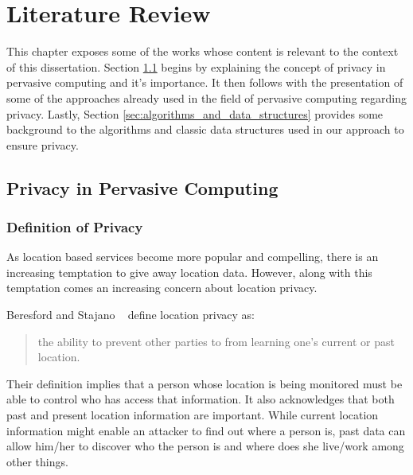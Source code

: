 \chapter{Literature Review}

This chapter exposes some of the works whose content is relevant to
the context of this dissertation. Section
\ref{sec:privacy_pervasive_computing} begins by explaining the concept
of privacy in pervasive computing and it's importance. It then follows
with the presentation of some of the approaches already used in the
field of pervasive computing regarding privacy. Lastly, Section
\ref{sec:algorithms_and_data_structures} provides some background to
the algorithms and classic data structures used in our approach to ensure
privacy.

\section{Privacy in Pervasive Computing}
\label{sec:privacy_pervasive_computing}

\subsection{Definition of Privacy}
\label{sec:definition_privacy}

As location based services become more popular and compelling, there
is an increasing temptation to give away location data. However, along
with this temptation comes an increasing concern about location privacy.

Beresford and Stajano ~\cite{1186725} define location privacy as:
\begin{quotation}
  the ability to prevent other parties to from learning one's
  current or past location.
\end{quotation}
Their definition implies that a person whose location is being
monitored must be able to control who has access that information.
It also acknowledges that both past and present location information
are important. While current location information might enable an
attacker to find out where a person is, past data can allow him/her to
discover who the person is and  where does she live/work among other
things.

